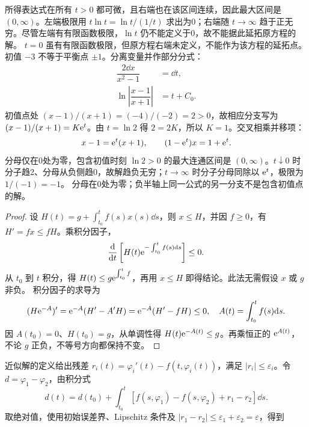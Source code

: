 所得表达式在所有 $t>0$ 都可微，且右端也在该区间连续，因此最大区间是 $(0,\infty)$。左端极限用 $t\ln t=\ln t/(1/t)$ 求出为0；右端随 $t\to\infty$ 趋于正无穷。尽管左端有有限函数极限，$\ln t$ 仍不能定义于0，故不能据此延拓原方程的解。
$t=0$ 虽有有限函数极限，但原方程右端未定义，不能作为该方程的延拓点。
初值 $-3$ 不等于平衡点 $\pm1$。分离变量并作部分分式：
\[
\begin{aligned}
\dfrac{2\dd x}{x^2-1}&=\dd t,\\
\ln\left|\dfrac{x-1}{x+1}\right|&=t+C_0.
\end{aligned}
\]
初值点处 $(x-1)/(x+1)=(-4)/(-2)=2>0$，故相应分支写为 $(x-1)/(x+1)=K\mathrm e^t$。由 $t=\ln2$ 得 $2=2K$，所以 $K=1$。交叉相乘并移项：
\[
x-1=\mathrm e^t(x+1),\qquad (1-\mathrm e^t)x=1+\mathrm e^t.
\]
分母仅在0处为零，包含初值时刻 $\ln2>0$ 的最大连通区间是 $(0,\infty)$。$t\downarrow0$ 时分子趋2、分母从负侧趋0，故解趋负无穷；$t\to\infty$ 时分子分母同除以 $\mathrm e^t$，极限为 $1/(-1)=-1$。
分母在0处为零；负半轴上同一公式的另一分支不是包含初值点的解。
\begin{proof}
设 $H(t)=g+\displaystyle\int_{t_0}^tf(s)x(s)\dd s$，则 $x\le H$，并因 $f\ge0$，有 $H'=fx\le fH$。乘积分因子，
\[
 \dfrac{\mathrm d}{\mathrm d t}\left[H(t)\mathrm e^{-\int_{t_0}^tf(s)\mathrm d s}\right]\le0.
\]
从 $t_0$ 到 $t$ 积分，得 $\displaystyle H(t)\le g\mathrm e^{\int_{t_0}^tf}$，再用 $x\le H$ 即得结论。此法无需假设 $x$ 或 $g$ 非负。
积分因子的求导为
\[
(H\mathrm e^{-A})'=\mathrm e^{-A}(H'-A'H)=\mathrm e^{-A}(H'-fH)\le0,
\quad A(t)=\int_{t_0}^tf(s)\mathrm d s.
\]
因 $A(t_0)=0$、$H(t_0)=g$，从单调性得 $H(t)\mathrm e^{-A(t)}\le g$。再乘恒正的 $\mathrm e^{A(t)}$，不论 $g$ 正负，不等号方向都保持不变。
\end{proof}
近似解的定义给出残差 $r_i(t)=\varphi_i'(t)-f(t,\varphi_i(t))$，满足 $|r_i|\le\varepsilon_i$。令 $d=\varphi_1-\varphi_2$，由积分式
\[
d(t)=d(t_0)+\int_{t_0}^t[f(s,\varphi_1)-f(s,\varphi_2)+r_1-r_2]\dd s.
\]
取绝对值，使用初始误差界、Lipschitz 条件及 $|r_1-r_2|\le\varepsilon_1+\varepsilon_2=\varepsilon$，得到
